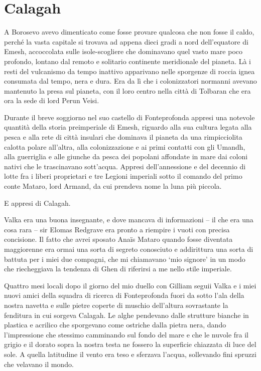 \chapter{Calagah}

A Borosevo avevo dimenticato come fosse provare qualcosa che non fosse
il caldo, perché la vasta capitale si trovava ad appena dieci gradi a
nord dell'equatore di Emesh, accoccolata sulle isole-scogliere che
dominavano quel vasto mare poco profondo, lontano dal remoto e solitario
continente meridionale del pianeta. Là i resti del vulcanismo da tempo
inattivo apparivano nelle sporgenze di roccia ignea consumata dal tempo,
nera e dura. Era da lì che i colonizzatori normanni avevano mantenuto la
presa sul pianeta, con il loro centro nella città di Tolbaran che era
ora la sede di lord Perun Veisi.

Durante il breve soggiorno nel suo castello di Fonteprofonda appresi una
notevole quantità della storia preimperiale di Emesh, riguardo alla sua
cultura legata alla pesca e alla rete di città insulari che dominava il
pianeta da una rimpicciolita calotta polare all'altra, alla
colonizzazione e ai primi contatti con gli Umandh, alla guerriglia e
alle giunche da pesca dei popolani affondate in mare dai coloni nativi
che le trascinavano sott'acqua. Appresi dell'annessione e del decennio
di lotte fra i liberi proprietari e tre Legioni imperiali sotto il
comando del primo conte Mataro, lord Armand, da cui prendeva nome la
luna più piccola.

E appresi di Calagah.

Valka era una buona insegnante, e dove mancava di informazioni -- il che
era una cosa rara -- sir Elomas Redgrave era pronto a riempire i vuoti
con precisa concisione. Il fatto che avrei sposato Anaïs Mataro quando
fosse diventata maggiorenne era ormai una sorta di segreto conosciuto e
addirittura una sorta di battuta per i miei due compagni, che mi
chiamavano `mio signore' in un modo che riecheggiava la tendenza di Ghen
di riferirsi a me nello stile imperiale.

Quattro mesi locali dopo il giorno del mio duello con Gilliam seguii
Valka e i miei nuovi amici della squadra di ricerca di Fonteprofonda
fuori da sotto l'ala della nostra navetta e sulle pietre coperte di
muschio dell'altura sovrastante la fenditura in cui sorgeva Calagah. Le
alghe pendevano dalle strutture bianche in plastica e acrilico che
sporgevano come ostriche dalla pietra nera, dando l'impressione che
stessimo camminando sul fondo del mare e che le nuvole fra il grigio e
il dorato sopra la nostra testa ne fossero la superficie chiazzata di
luce del sole. A quella latitudine il vento era teso e sferzava l'acqua,
sollevando fini spruzzi che velavano il mondo.

